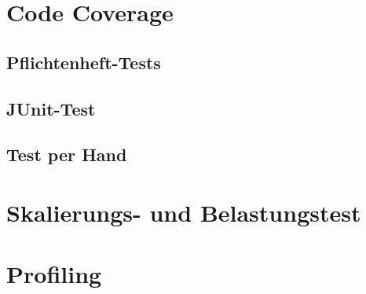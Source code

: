 \documentclass[10pt]{scrreprt}
\begin{document}
\chapter{Code Coverage}
\section{Pflichtenheft-Tests}
\section{JUnit-Test}
\section{Test per Hand}
\chapter{Skalierungs- und Belastungstest}
\chapter{Profiling}
\end{document}
